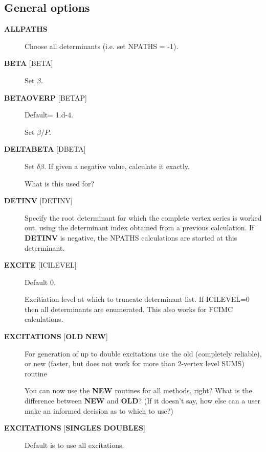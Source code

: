 \documentclass[openany,a4paper,10pt]{manual}
\begin{document}
\subsection{General options}
\begin{description}
\item[\textbf{ALLPATHS}]
Choose all determinants (i.e. set NPATHS = -1).

\item[\textbf{BETA} {[}BETA{]}]
Set $\beta$.

\item[\textbf{BETAOVERP} {[}BETAP{]}]
Default= 1.d-4.

Set $\beta/P$.

\item[\textbf{DELTABETA} {[}DBETA{]}]
Set $\delta\beta$.  If given a negative value, calculate it exactly.

\begin{notice}[note]
What is this used for?
\end{notice}

\item[\textbf{DETINV} {[}DETINV{]}]
Specify the root determinant for which the complete vertex series is
worked out, using the determinant index obtained from a previous
calculation.  If \textbf{DETINV} is negative, the NPATHS calculations
are started at this determinant.

\item[\textbf{EXCITE} {[}ICILEVEL{]}]
Default 0.

Excitiation level at which to truncate determinant list.  If ICILEVEL=0
then all determinants are enumerated.
This also works for FCIMC calculations.

\item[\textbf{EXCITATIONS} {[}\textbf{OLD} \textbf{NEW}{]}]
For generation of up to double excitations use the old (completely
reliable), or new (faster, but does not work for more than 2-vertex
level SUMS) routine

\begin{notice}[note]
You can now use the \textbf{NEW} routines for all methods, right?
What is the difference between \textbf{NEW} and \textbf{OLD}?  (If it doesn't say, how else
can a user make an informed decision as to which to use?)
\end{notice}

\item[\textbf{EXCITATIONS} {[}\textbf{SINGLES} \textbf{DOUBLES}{]}]
Default is to use all excitations.


\end{description}
\end{document}
